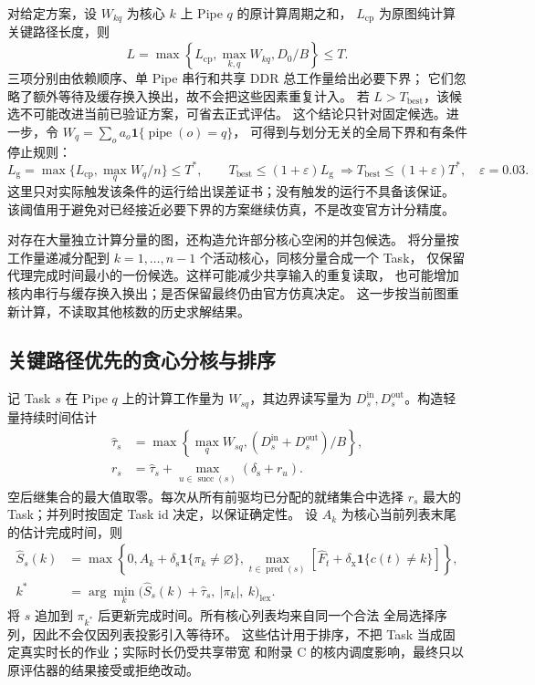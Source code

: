 对给定方案，设 $W_{kq}$ 为核心 $k$ 上 Pipe $q$ 的原计算周期之和，
$L_{\mathrm{cp}}$ 为原图纯计算关键路径长度，则
\begin{equation}
 L=\max\left\{L_{\mathrm{cp}},\max_{k,q}W_{kq},D_0/B\right\}\le T .
 \label{eq:q1-lower-bound}
\end{equation}
三项分别由依赖顺序、单 Pipe 串行和共享 DDR 总工作量给出必要下界；
它们忽略了额外等待及缓存换入换出，故不会把这些因素重复计入。
若 $L>T_{\mathrm{best}}$，该候选不可能改进当前已验证方案，可省去正式评估。
这个结论只针对固定候选。进一步，令 $W_q=\sum_o a_o\mathbf1\{\operatorname{pipe}(o)=q\}$，
可得到与划分无关的全局下界和有条件停止规则：
\begin{equation}
 L_{\mathrm g}=\max\{L_{\mathrm{cp}},\max_q W_q/n\}\le T^*,\qquad
 T_{\mathrm{best}}\le(1+\varepsilon)L_{\mathrm g}\ \Longrightarrow
 T_{\mathrm{best}}\le(1+\varepsilon)T^*,\quad\varepsilon=0.03.
 \label{eq:q1-certificate}
\end{equation}
这里只对实际触发该条件的运行给出误差证书；没有触发的运行不具备该保证。
该阈值用于避免对已经接近必要下界的方案继续仿真，不是改变官方计分精度。

对存在大量独立计算分量的图，还构造允许部分核心空闲的并包候选。
将分量按工作量递减分配到 $k=1,\ldots,n-1$ 个活动核心，同核分量合成一个 Task，
仅保留代理完成时间最小的一份候选。这样可能减少共享输入的重复读取，
也可能增加核内串行与缓存换入换出；是否保留最终仍由官方仿真决定。
这一步按当前图重新计算，不读取其他核数的历史求解结果。

\subsection{关键路径优先的贪心分核与排序}
记 Task $s$ 在 Pipe $q$ 上的计算工作量为 $W_{sq}$，其边界读写量为
$D_s^{\mathrm{in}},D_s^{\mathrm{out}}$。构造轻量持续时间估计
\begin{align}
 \widehat\tau_s&=\max\left\{\max_q W_{sq},
 (D_s^{\mathrm{in}}+D_s^{\mathrm{out}})/B\right\}, \label{eq:q1-duration}\\
 r_s&=\widehat\tau_s+\max_{u\in\operatorname{succ}(s)}
 (\delta_{\mathrm{s}}+r_u). \label{eq:q1-rank}
\end{align}
空后继集合的最大值取零。每次从所有前驱均已分配的就绪集合中选择
$r_s$ 最大的 Task；并列时按固定 Task id 决定，以保证确定性。
设 $A_k$ 为核心当前列表末尾的估计完成时间，则
\begin{align}
 \widehat S_s(k)&=\max\left\{0,
 A_k+\delta_{\mathrm{s}}\mathbf1\{\pi_k\ne\varnothing\},
 \max_{t\in\operatorname{pred}(s)}
 [\widehat F_t+\delta_{\mathrm{x}}\mathbf1\{c(t)\ne k\}]
 \right\},\label{eq:q1-est}\\
 k^*&=\arg\min_k\bigl(\widehat S_s(k)+\widehat\tau_s,\ |\pi_k|,\ k\bigr)_{\mathrm{lex}}.
 \label{eq:q1-eft}
\end{align}
将 $s$ 追加到 $\pi_{k^*}$ 后更新完成时间。所有核心列表均来自同一个合法
全局选择序列，因此不会仅因列表投影引入等待环。
这些估计用于排序，不把 Task 当成固定真实时长的作业；实际时长仍受共享带宽
和附录 C 的核内调度影响，最终只以原评估器的结果接受或拒绝改动。

